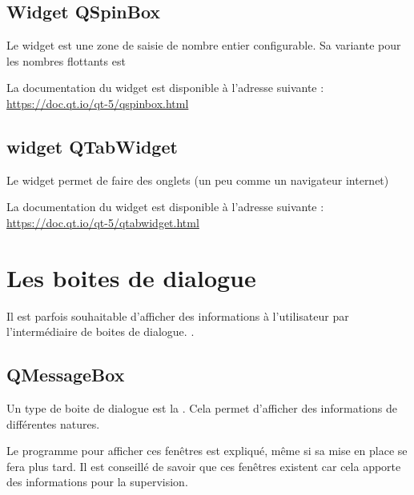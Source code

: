 

\subsection{Widget QSpinBox}

Le widget  est une zone de saisie de nombre entier configurable.
Sa variante pour les nombres flottants est  

La documentation du widget est disponible à l'adresse suivante : \newline  \url{https://doc.qt.io/qt-5/qspinbox.html} 


\subsection{widget QTabWidget}

Le widget  permet de faire des onglets (un peu comme un navigateur internet)


La documentation du widget est disponible à l'adresse suivante : \newline  \url{https://doc.qt.io/qt-5/qtabwidget.html} 

\section{Les boites de dialogue}

Il est parfois souhaitable d'afficher des informations à l'utilisateur par l'intermédiaire de boites de dialogue. \newline.

\subsection{QMessageBox}

Un type de boite de dialogue est la . Cela permet d'afficher des informations de différentes natures.\newline

Le programme pour afficher ces fenêtres est expliqué, même si sa mise en place se fera plus tard. \newline
Il est conseillé de savoir que ces fenêtres existent car cela apporte des informations pour la supervision.\newline


